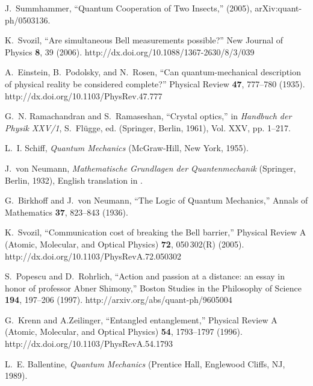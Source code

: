 \documentclass[pra,amsfonts,showpacs,showkeys,preprint]{revtex4}
\begin{document}
\begin{thebibliography}{10}
J.~Summhammer, \enquote{Quantum Cooperation of Two Insects,}  (2005),
  arXiv:quant-ph/0503136.

K.~Svozil, \enquote{Are simultaneous Bell measurements possible?} New Journal
  of Physics {\bf 8}, 39 (2006).
\newline http://dx.doi.org/10.1088/1367-2630/8/3/039

A.~Einstein, B.~Podolsky, and N.~Rosen, \enquote{Can quantum-mechanical
  description of physical reality be considered complete?} Physical Review {\bf
  47}, 777--780 (1935).
\newline http://dx.doi.org/10.1103/PhysRev.47.777

G.~N. Ramachandran and S.~Ramaseshan, \enquote{Crystal optics,} in {\em
  Handbuch der Physik XXV/1\/}, S.~Fl{\"{u}}gge, ed.  (Springer, Berlin, 1961),
  Vol. XXV, pp. 1--217.

L.~I. Schiff, {\em Quantum Mechanics\/} (McGraw-Hill, New York, 1955).

J.~von Neumann, {\em Mathematische Grundlagen der Quantenmechanik\/} (Springer,
  Berlin, 1932), {E}nglish translation in \cite{v-neumann-55}.

G.~Birkhoff and J.~von Neumann, \enquote{The Logic of Quantum Mechanics,}
  Annals of Mathematics {\bf 37}, 823--843 (1936).

K.~Svozil, \enquote{Communication cost of breaking the {B}ell barrier,}
  Physical Review A (Atomic, Molecular, and Optical Physics) {\bf 72},
  050\,302(R) (2005).
\newline http://dx.doi.org/10.1103/PhysRevA.72.050302

S.~Popescu and D.~Rohrlich, \enquote{Action and passion at a distance: an essay
  in honor of professor {A}bner {S}himony,} Boston Studies in the Philosophy of
  Science {\bf 194}, 197--206 (1997).
\newline http://arxiv.org/abs/quant-ph/9605004

G.~Krenn and A.Zeilinger, \enquote{Entangled entanglement,} Physical Review A
  (Atomic, Molecular, and Optical Physics) {\bf 54}, 1793--1797 (1996).
\newline http://dx.doi.org/10.1103/PhysRevA.54.1793

L.~E. Ballentine, {\em Quantum Mechanics\/} (Prentice Hall, Englewood Cliffs,
  NJ, 1989).


\end{thebibliography}
\end{document}
